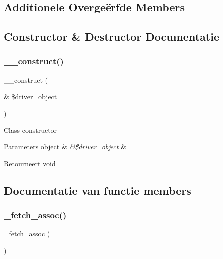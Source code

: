 \subsection*{Additionele Overge\"{e}rfde Members}


\subsection{Constructor \& Destructor Documentatie}
\mbox{\label{class_c_i___d_b__mysql__result_a8e093c8b6e5733bc3f306385ee426ab7}} 
\subsubsection{\texorpdfstring{\_\_construct()}{\_\_construct()}}
{\footnotesize\ttfamily \+\_\+\+\_\+construct (\begin{DoxyParamCaption}\item[{\&}]{\$driver\+\_\+object }\end{DoxyParamCaption})}

Class constructor


\begin{DoxyParams}[1]{Parameters}
object & {\em \&\$driver\+\_\+object} & \\
\hline
\end{DoxyParams}
\begin{DoxyReturn}{Retourneert}
void 
\end{DoxyReturn}


\subsection{Documentatie van functie members}
\mbox{\label{class_c_i___d_b__mysql__result_a43a9a92817f1334a1c10752ec44275a0}} 
\subsubsection{\texorpdfstring{\_fetch\_assoc()}{\_fetch\_assoc()}}
{\footnotesize\ttfamily \+\_\+fetch\+\_\+assoc (\begin{DoxyParamCaption}{ }\end{DoxyParamCaption})\hspace{0.3cm}{\ttfamily [protected]}}

